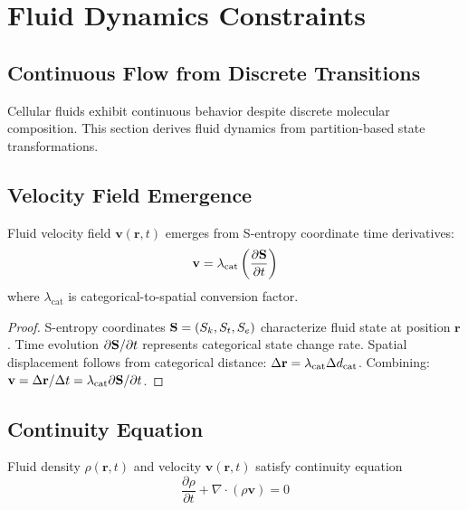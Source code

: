\section{Fluid Dynamics Constraints}

\subsection{Continuous Flow from Discrete Transitions}

Cellular fluids exhibit continuous behavior despite discrete molecular composition. This section derives fluid dynamics from partition-based state transformations.

\subsection{Velocity Field Emergence}

\begin{theorem}
\label{thm:velocity_field}
Fluid velocity field $\mathbf{v}(\mathbf{r},t)$ emerges from S-entropy coordinate time derivatives:
\begin{equation}
\mathbf{v} = \lambda_{\text{cat}} \left(\frac{\partial\mathbf{S}}{\partial t}\right)
\end{equation}
where $\lambda_{\text{cat}}$ is categorical-to-spatial conversion factor.
\end{theorem}

\begin{proof}
S-entropy coordinates $\mathbf{S} = (S_k,S_t,S_e)$ characterize fluid state at position $\mathbf{r}$. Time evolution $\partial\mathbf{S}/\partial t$ represents categorical state change rate. Spatial displacement follows from categorical distance: $\Delta\mathbf{r} = \lambda_{\text{cat}} \Delta d_{\mathrm{cat}}$. Combining: $\mathbf{v} = \Delta\mathbf{r}/\Delta t = \lambda_{\text{cat}} \partial\mathbf{S}/\partial t$.
\end{proof}

\subsection{Continuity Equation}

\begin{theorem}
Fluid density $\rho(\mathbf{r},t)$ and velocity $\mathbf{v}(\mathbf{r},t)$ satisfy continuity equation
\begin{equation}
\frac{\partial\rho}{\partial t} + \nabla \cdot (\rho\mathbf{v}) = 0
\end{equation}
\end{theorem}

